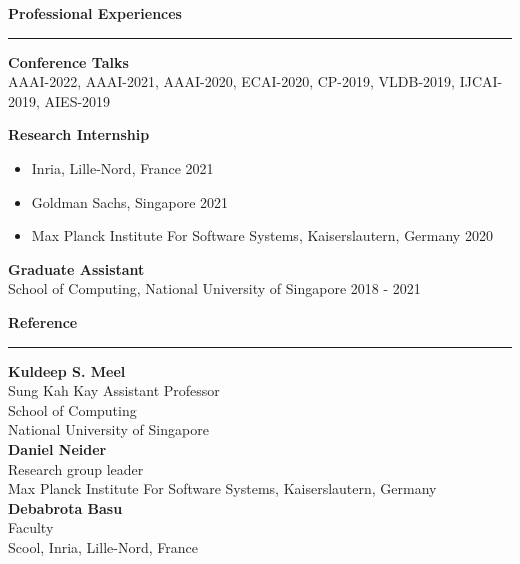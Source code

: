 \documentclass[a4paper,11pt,final]{article}
\newcommand{\Sep}{\vspace{1.5em}}
\newcommand{\SmallSep}{\vspace{0.5em}}
\begin{document}
\Sep
\newpage
\Large { \textbf{Professional Experiences}}\\
\noindent\rule{\textwidth}{1pt}
\normalsize
\textbf{Conference Talks}\\
AAAI-2022, AAAI-2021, AAAI-2020, ECAI-2020, CP-2019, VLDB-2019, IJCAI-2019, AIES-2019

\SmallSep
\textbf{Research Internship}
\begin{itemize}
	\item Inria, Lille-Nord, France \hspace*{\fill}2021
	\item Goldman Sachs, Singapore \hspace*{\fill}2021
	\item  Max Planck Institute For Software Systems, Kaiserslautern, Germany \hspace*{\fill}2020
\end{itemize}


\SmallSep
\textbf{Graduate Assistant}\\
School of Computing, National University of Singapore \hspace*{\fill} 2018  - 2021

\Sep
\Large{\textbf{Reference}}\\
\noindent\rule{\textwidth}{1pt}
\normalsize
\textbf{Kuldeep S. Meel}\\
Sung Kah Kay Assistant Professor\\
School of Computing\\
National University of Singapore\\

\textbf{Daniel Neider}\\
Research group leader\\
Max Planck Institute For Software Systems, Kaiserslautern, Germany \\

\textbf{Debabrota Basu}\\
Faculty\\
Scool, Inria, Lille-Nord, France
\end{document}

